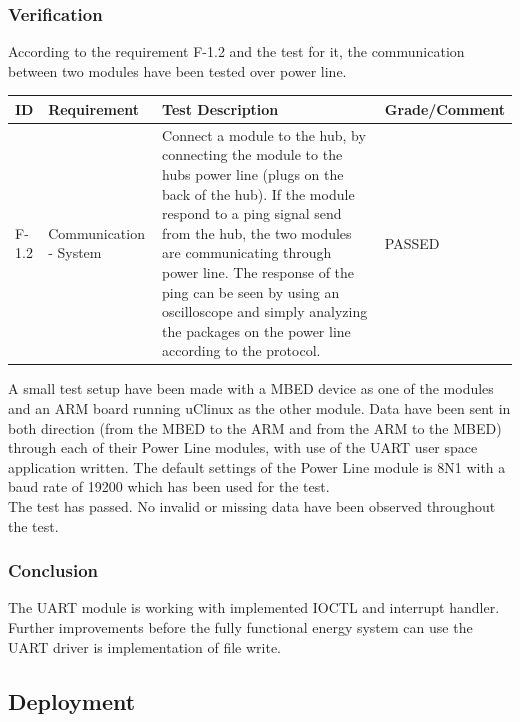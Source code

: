 \subsubsection{Verification}
According to the requirement F-1.2 and the test for it, the communication between two modules have been tested over power line. 
\begin{table}[H]
\centering
	\begin{tabular}{|p{1.2cm}|p{2.3cm}|p{9.5cm}|p{2.5cm}|}
	\hline
	ID		& Requirement		& Test Description		& Grade/Comment\\\hline
	F-1.2		& Communication - System & Connect a module to the hub, by connecting the module to the hubs power line (plugs on the back of the hub). If the module respond to a ping signal send from the hub, the two modules are communicating through power line. The response of the ping can be seen by using an oscilloscope and simply analyzing the packages on the power line according to the protocol. & PASSED\\\hline
	\end{tabular}
\end{table}
A small test setup have been made with a MBED device as one of the modules and an ARM board running uClinux as the other module. Data have been sent in both direction (from the MBED to the ARM and from the ARM to the MBED) through each of their Power Line modules, with use of the UART user space application written. The default settings of the Power Line module is 8N1 with a baud rate of 19200 which has been used for the test. 
\\ The test has passed. No invalid or missing data have been observed throughout the test. 
%
\subsubsection{Conclusion}
The UART module is working with implemented IOCTL and interrupt handler.
Further improvements before the fully functional energy system can use the UART driver is implementation of file write.
\subsection{Deployment}
